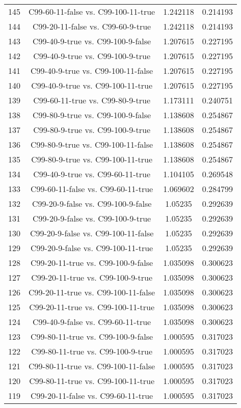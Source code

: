 \documentclass[a4paper,10pt]{article}
\begin{document}
\begin{landscape}
\begin{table}[!htp]
\begin{tabular}{cccc}
145&C99-60-11-false vs. C99-100-11-true&1.242118&0.214193\\
144&C99-20-11-false vs. C99-60-9-true&1.242118&0.214193\\
143&C99-40-9-true vs. C99-100-9-false&1.207615&0.227195\\
142&C99-40-9-true vs. C99-100-9-true&1.207615&0.227195\\
141&C99-40-9-true vs. C99-100-11-false&1.207615&0.227195\\
140&C99-40-9-true vs. C99-100-11-true&1.207615&0.227195\\
139&C99-60-11-true vs. C99-80-9-true&1.173111&0.240751\\
138&C99-80-9-true vs. C99-100-9-false&1.138608&0.254867\\
137&C99-80-9-true vs. C99-100-9-true&1.138608&0.254867\\
136&C99-80-9-true vs. C99-100-11-false&1.138608&0.254867\\
135&C99-80-9-true vs. C99-100-11-true&1.138608&0.254867\\
134&C99-40-9-true vs. C99-60-11-true&1.104105&0.269548\\
133&C99-60-11-false vs. C99-60-11-true&1.069602&0.284799\\
132&C99-20-9-false vs. C99-100-9-false&1.05235&0.292639\\
131&C99-20-9-false vs. C99-100-9-true&1.05235&0.292639\\
130&C99-20-9-false vs. C99-100-11-false&1.05235&0.292639\\
129&C99-20-9-false vs. C99-100-11-true&1.05235&0.292639\\
128&C99-20-11-true vs. C99-100-9-false&1.035098&0.300623\\
127&C99-20-11-true vs. C99-100-9-true&1.035098&0.300623\\
126&C99-20-11-true vs. C99-100-11-false&1.035098&0.300623\\
125&C99-20-11-true vs. C99-100-11-true&1.035098&0.300623\\
124&C99-40-9-false vs. C99-60-11-true&1.035098&0.300623\\
123&C99-80-11-true vs. C99-100-9-false&1.000595&0.317023\\
122&C99-80-11-true vs. C99-100-9-true&1.000595&0.317023\\
121&C99-80-11-true vs. C99-100-11-false&1.000595&0.317023\\
120&C99-80-11-true vs. C99-100-11-true&1.000595&0.317023\\
119&C99-20-11-false vs. C99-60-11-true&1.000595&0.317023\\

\end{tabular}
\end{table}
\end{landscape}
\end{document}
